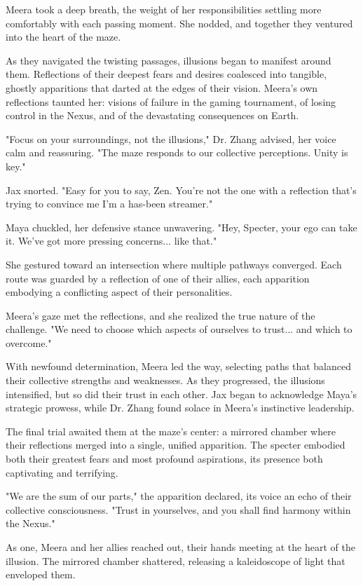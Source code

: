 \documentclass[12pt]{book}
\begin{document}
Meera took a deep breath, the weight of her responsibilities settling
more comfortably with each passing moment. She nodded, and together they
ventured into the heart of the maze.

As they navigated the twisting passages, illusions began to manifest
around them. Reflections of their deepest fears and desires coalesced
into tangible, ghostly apparitions that darted at the edges of their
vision. Meera's own reflections taunted her: visions of failure in the
gaming tournament, of losing control in the Nexus, and of the
devastating consequences on Earth.

"Focus on your surroundings, not the illusions," Dr. Zhang advised, her
voice calm and reassuring. "The maze responds to our collective
perceptions. Unity is key."

Jax snorted. "Easy for you to say, Zen. You're not the one with a
reflection that's trying to convince me I'm a has-been streamer."

Maya chuckled, her defensive stance unwavering. "Hey, Specter, your ego
can take it. We've got more pressing concerns... like that."

She gestured toward an intersection where multiple pathways converged.
Each route was guarded by a reflection of one of their allies, each
apparition embodying a conflicting aspect of their personalities.

Meera's gaze met the reflections, and she realized the true nature of
the challenge. "We need to choose which aspects of ourselves to trust...
and which to overcome."

With newfound determination, Meera led the way, selecting paths that
balanced their collective strengths and weaknesses. As they progressed,
the illusions intensified, but so did their trust in each other. Jax
began to acknowledge Maya's strategic prowess, while Dr. Zhang found
solace in Meera's instinctive leadership.

The final trial awaited them at the maze's center: a mirrored chamber
where their reflections merged into a single, unified apparition. The
specter embodied both their greatest fears and most profound
aspirations, its presence both captivating and terrifying.

"We are the sum of our parts," the apparition declared, its voice an
echo of their collective consciousness. "Trust in yourselves, and you
shall find harmony within the Nexus."

As one, Meera and her allies reached out, their hands meeting at the
heart of the illusion. The mirrored chamber shattered, releasing a
kaleidoscope of light that enveloped them.
\end{document}
